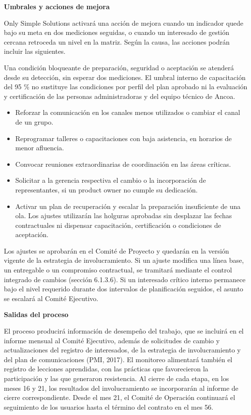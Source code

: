 \documentclass[11pt]{article}
\begin{document}
\textbf{Umbrales y acciones de mejora}

Only Simple Solutions activará una acción de mejora cuando un indicador
quede bajo su meta en dos mediciones seguidas, o cuando un interesado de
gestión cercana retroceda un nivel en la matriz. Según la causa, las
acciones podrán incluir las siguientes.

Una condición bloqueante de preparación, seguridad o aceptación se
atenderá desde su detección, sin esperar dos mediciones. El umbral
interno de capacitación del 95 \% no sustituye las condiciones por
perfil del plan aprobado ni la evaluación y certificación de las personas
administradoras y del equipo técnico de Ancoa.

\begin{itemize}
\item
  Reforzar la comunicación en los canales menos utilizados o cambiar el
  canal de un grupo.
\item
  Reprogramar talleres o capacitaciones con baja asistencia, en horarios
  de menor afluencia.
\item
  Convocar reuniones extraordinarias de coordinación en las áreas
  críticas.
\item
  Solicitar a la gerencia respectiva el cambio o la incorporación de
  representantes, si un product owner no cumple su dedicación.
\item
  Activar un plan de recuperación y escalar la preparación insuficiente
  de una ola. Los ajustes utilizarán las holguras aprobadas sin
  desplazar las fechas contractuales ni dispensar capacitación,
  certificación o condiciones de aceptación.
\end{itemize}

Los ajustes se aprobarán en el Comité de Proyecto y quedarán en la
versión vigente de la estrategia de involucramiento. Si un ajuste
modifica una línea base, un entregable o un compromiso contractual, se
tramitará mediante el control integrado de cambios (sección 6.1.3.6). Si
un interesado crítico interno permanece bajo el nivel requerido durante
dos intervalos de planificación seguidos, el asunto se escalará al Comité Ejecutivo.

\textbf{Salidas del proceso}

El proceso producirá información de desempeño del trabajo, que se
incluirá en el informe mensual al Comité Ejecutivo, además de
solicitudes de cambio y actualizaciones del registro de interesados, de
la estrategia de involucramiento y del plan de comunicaciones (PMI,
2017). El monitoreo alimentará también el registro de lecciones
aprendidas, con las prácticas que favorecieron la participación y las
que generaron resistencia. Al cierre de cada etapa, en los meses 16 y
21, los resultados del involucramiento se incorporarán al informe de
cierre correspondiente. Desde el mes 21, el Comité de Operación
continuará el seguimiento de los usuarios hasta el término del contrato
en el mes 56.
\end{document}
